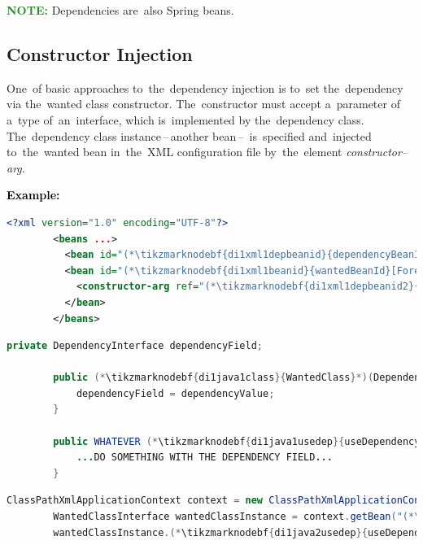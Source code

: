 \documentclass[12pt, dvipsnames, oneside, a4paper, titlepage, usenames]{report}
\newcommand{\newsubsection}[1]{\subsection*{#1}\addcontentsline{toc}{subsection}{#1}}
\newcommand{\highlight}[2]{\vspace{\baselineskip}\noindent\textcolor{#2}{\textbf{#1}}}
\newcommand{\note}{\highlight{NOTE: }{ForestGreen}}
\newcommand{\example}{\highlight{Example: }{black}}
\begin{document}
    \note Dependencies are~also Spring beans.

    \newsubsection{Constructor Injection}
    \label{constructorinjection}
    One~of basic approaches to~the~dependency injection is to~set the~dependency via the~wanted class constructor. The~constructor must accept a~parameter of a~type of~an~interface, which is~implemented by the~dependency class. The~dependency class instance\,--\,another bean\,--\, is~specified and~injected to~the~wanted bean in~the~XML configuration file by~the~element \textit{constructor--arg}.

    \example
    \begin{lstlisting}[language=XML, title={Configuration XML}]
        <?xml version="1.0" encoding="UTF-8"?>
        <beans ...>
          <bean id="(*\tikzmarknodebf{di1xml1depbeanid}{dependencyBeanId}[ForestGreen]*)" class="package.subfolder.DependencyClass"/>
          <bean id="(*\tikzmarknodebf{di1xml1beanid}{wantedBeanId}[ForestGreen]*)" class="package.subfolder.(*\tikzmarknodebf{di1xml1class}{WantedClass}[ForestGreen]*)">
            <constructor-arg ref="(*\tikzmarknodebf{di1xml1depbeanid2}{dependencyBeanId}[ForestGreen]*)"/>
          </bean>
        </beans>
    \end{lstlisting}
    \begin{lstlisting}[language=Java, title={Wanted class with the constructor}]
        private DependencyInterface dependencyField;

        public (*\tikzmarknodebf{di1java1class}{WantedClass}*)(DependencyInterface dependencyValue) {
            dependencyField = dependencyValue;
        }

        public WHATEVER (*\tikzmarknodebf{di1java1usedep}{useDependency}[ForestGreen]*)() {
            ...DO SOMETHING WITH THE DEPENDENCY FIELD...
        }
    \end{lstlisting}
    \begin{lstlisting}[language=Java, title={Usage}]
        ClassPathXmlApplicationContext context = new ClassPathXmlApplicationContext("configurationFile.xml");
        WantedClassInterface wantedClassInstance = context.getBean("(*\tikzmarknodebf{di1java2beanid}{wantedBeanId}[ForestGreen]*)", WantedClassInterface.class);
        wantedClassInstance.(*\tikzmarknodebf{di1java2usedep}{useDependency}*)();
    \end{lstlisting}
\end{document}

